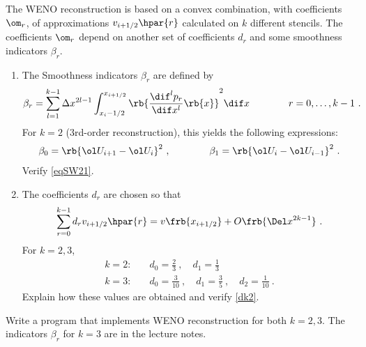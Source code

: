 \documentclass{article}
\begin{document}








\begin{exerciseList}


\item
The WENO reconstruction is based on a convex combination, with coefficients $\om_r$, of approximations $v_{i+1/2}\hpar{r}$ calculated on $k$ different stencils.
The coefficients $\om_r$ depend on another set of coefficients $d_r$ and some smoothness indicators $\beta_r$.

\begin{enumerate}



\item
The Smoothness indicators $\beta_r$ are defined by
\begin{gather} \label{smWts}
	\beta_r=\sum_{l=1}^{k-1}\Delta x^{2l-1}
		\int_{x_i-1/2}^{x_{i+1/2} }\rb{\frac{\dif^lp_r}{\dif x^l}\rb{x}}^2\dif x
	\qquad\qquad r=0,\ldots,k-1\ .
\end{gather}%
For $k=2$ (3rd-order reconstruction), this yields the following expressions:
\begin{gather} \label{eqSW21}
	\beta_0 =\rb{\ol U_{i+1}-\ol U_{i}}^2\ ,
	\qquad\qquad
	\beta_1 =\rb{\ol U_{i}-\ol U_{i-1}}^2\ .
\end{gather}%
Verify \eqref{eqSW21}.


\item
The coefficients $d_r$ are chosen so that
\begin{gather}%
	\sum_{r=0}^{k-1} d_rv_{i+1/2}\hpar{r}=v\frb{x_{i+1/2}}+O\frb{\Del x^{2k-1}}\ .
\end{gather}%
For $k=2,3$,
\begin{align}
\label{dk2}
	k=2: \quad & d_{0}=\frac{2}{3}\ ,\quad d_{1}=\frac{1}{3}\\
	k=3: \quad & d_{0}=\frac{3}{10}\ ,\quad d_{1}=\frac{3}{5}\ ,\quad d_{2}=\frac{1}{10}\ .
\end{align}
Explain how these values are obtained and verify \eqref{dk2}.

\end{enumerate}

\item
Write a program that implements WENO reconstruction for both $k=2,3$. The indicators $\beta_r$ for $k=3$ are in the lecture notes.


\end{exerciseList}
\end{document}

